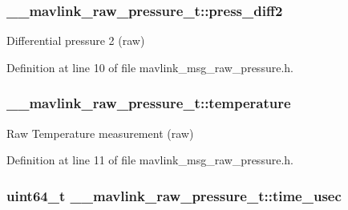 \hypertarget{struct____mavlink__raw__pressure__t_a7b832c03aaa2a3f55e309d590d9fc93b}{
\subsubsection[{press\-\_\-diff2}]{ \-\_\-\-\_\-mavlink\-\_\-raw\-\_\-pressure\-\_\-t\-::press\-\_\-diff2}}\label{struct____mavlink__raw__pressure__t_a7b832c03aaa2a3f55e309d590d9fc93b}


Differential pressure 2 (raw) 



Definition at line 10 of file mavlink\-\_\-msg\-\_\-raw\-\_\-pressure.\-h.

\hypertarget{struct____mavlink__raw__pressure__t_a7d57fd80130f0588285f03669bf8c016}{
\subsubsection[{temperature}]{ \-\_\-\-\_\-mavlink\-\_\-raw\-\_\-pressure\-\_\-t\-::temperature}}\label{struct____mavlink__raw__pressure__t_a7d57fd80130f0588285f03669bf8c016}


Raw Temperature measurement (raw) 



Definition at line 11 of file mavlink\-\_\-msg\-\_\-raw\-\_\-pressure.\-h.

\hypertarget{struct____mavlink__raw__pressure__t_a659746eb22bad8e9e29aac0efcba19d2}{
\subsubsection[{time\-\_\-usec}]{\setlength{\rightskip}{0pt plus 5cm}uint64\-\_\-t \-\_\-\-\_\-mavlink\-\_\-raw\-\_\-pressure\-\_\-t\-::time\-\_\-usec}}\label{struct____mavlink__raw__pressure__t_a659746eb22bad8e9e29aac0efcba19d2}


